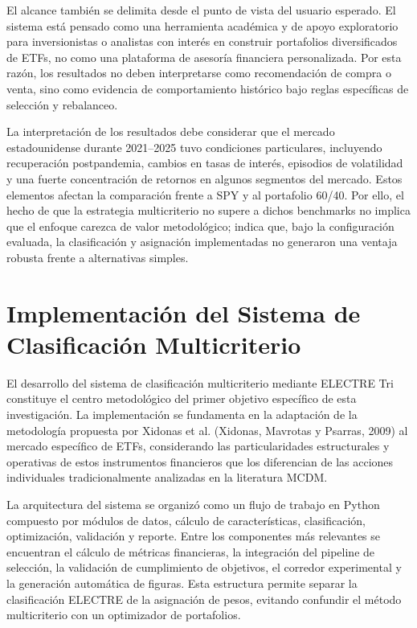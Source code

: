 \documentclass[12pt,letterpaper]{article}
\begin{document}
El alcance también se delimita desde el punto de vista del usuario esperado. El sistema está pensado como una herramienta académica y de apoyo exploratorio para inversionistas o analistas con interés en construir portafolios diversificados de ETFs, no como una plataforma de asesoría financiera personalizada. Por esta razón, los resultados no deben interpretarse como recomendación de compra o venta, sino como evidencia de comportamiento histórico bajo reglas específicas de selección y rebalanceo.

La interpretación de los resultados debe considerar que el mercado estadounidense durante 2021--2025 tuvo condiciones particulares, incluyendo recuperación postpandemia, cambios en tasas de interés, episodios de volatilidad y una fuerte concentración de retornos en algunos segmentos del mercado. Estos elementos afectan la comparación frente a SPY y al portafolio 60/40. Por ello, el hecho de que la estrategia multicriterio no supere a dichos benchmarks no implica que el enfoque carezca de valor metodológico; indica que, bajo la configuración evaluada, la clasificación y asignación implementadas no generaron una ventaja robusta frente a alternativas simples.

\clearpage
\section{Implementación del Sistema de Clasificación Multicriterio}

El desarrollo del sistema de clasificación multicriterio mediante ELECTRE Tri constituye el centro metodológico del primer objetivo específico de esta investigación. La implementación se fundamenta en la adaptación de la metodología propuesta por Xidonas et al. (Xidonas, Mavrotas y Psarras, 2009) al mercado específico de ETFs, considerando las particularidades estructurales y operativas de estos instrumentos financieros que los diferencian de las acciones individuales tradicionalmente analizadas en la literatura MCDM.

La arquitectura del sistema se organizó como un flujo de trabajo en Python compuesto por módulos de datos, cálculo de características, clasificación, optimización, validación y reporte. Entre los componentes más relevantes se encuentran el cálculo de métricas financieras, la integración del pipeline de selección, la validación de cumplimiento de objetivos, el corredor experimental y la generación automática de figuras. Esta estructura permite separar la clasificación ELECTRE de la asignación de pesos, evitando confundir el método multicriterio con un optimizador de portafolios.
\end{document}
